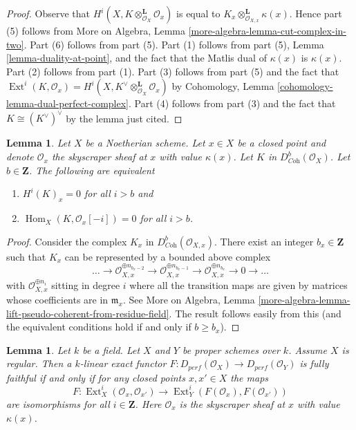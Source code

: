 \documentclass{stacks-project}
\theoremstyle{plain}
\newtheorem{lemma}[subsection]{Lemma}
\theoremstyle{definition}
\theoremstyle{remark}
\numberwithin{equation}{subsection}
\def\Hom{\mathop{\mathrm{Hom}}\nolimits}
\def\Ext{\mathop{\mathrm{Ext}}\nolimits}
\begin{document}
\begin{proof}
Observe that $H^i(X, K \otimes_{\mathcal{O}_X}^\mathbf{L} \mathcal{O}_x)$
is equal to $K_x  \otimes_{\mathcal{O}_{X, x}}^\mathbf{L} \kappa(x)$.
Hence part (5) follows from More on Algebra, Lemma
\ref{more-algebra-lemma-cut-complex-in-two}.
Part (6) follows from part (5).
Part (1) follows from part (5), Lemma \ref{lemma-duality-at-point}, and the
fact that the Matlis dual of $\kappa(x)$ is $\kappa(x)$.
Part (2) follows from part (1).
Part (3) follows from part (5) and the fact that
$\Ext^i(K, \mathcal{O}_x) =
H^i(X, K^\vee \otimes_{\mathcal{O}_X}^\mathbf{L} \mathcal{O}_x)$ by
Cohomology, Lemma \ref{cohomology-lemma-dual-perfect-complex}.
Part (4) follows from part (3) and the fact that $K \cong (K^\vee)^\vee$
by the lemma just cited.
\end{proof}

\begin{lemma}
\label{lemma-hom-into-point-sheaf}
Let $X$ be a Noetherian scheme. Let $x \in X$ be a closed point and
denote $\mathcal{O}_x$ the skyscraper sheaf at $x$ with value $\kappa(x)$.
Let $K$ in $D^b_{\textit{Coh}}(\mathcal{O}_X)$. Let $b \in \mathbf{Z}$.
The following are equivalent
\begin{enumerate}
\item $H^i(K)_x = 0$ for all $i > b$ and
\item $\Hom_X(K, \mathcal{O}_x[-i]) = 0$ for all $i > b$.
\end{enumerate}
\end{lemma}

\begin{proof}
Consider the complex $K_x$ in $D^b_{\textit{Coh}}(\mathcal{O}_{X, x})$.
There exist an integer $b_x \in \mathbf{Z}$ such that $K_x$
can be represented by a bounded above complex
$$
\ldots \to
\mathcal{O}_{X, x}^{\oplus n_{b_x - 2}} \to
\mathcal{O}_{X, x}^{\oplus n_{b_x - 1}} \to
\mathcal{O}_{X, x}^{\oplus n_{b_x}} \to 0 \to \ldots
$$
with $\mathcal{O}_{X, x}^{\oplus n_i}$ sitting in degree $i$
where all the transition maps are given by matrices whose
coefficients are in $\mathfrak m_x$. See
More on Algebra, Lemma
\ref{more-algebra-lemma-lift-pseudo-coherent-from-residue-field}.
The result follows easily from this (and the equivalent
conditions hold if and only if $b \geq b_x$).
\end{proof}

\begin{lemma}
\label{lemma-get-fully-faithful-geometric}
Let $k$ be a field. Let $X$ and $Y$ be proper schemes over $k$.
Assume $X$ is regular. Then a $k$-linear exact functor
$F : D_{perf}(\mathcal{O}_X) \to D_{perf}(\mathcal{O}_Y)$
is fully faithful if and only if
for any closed points $x, x' \in X$ the maps
$$
F : \Ext^i_X(\mathcal{O}_x, \mathcal{O}_{x'})
\longrightarrow
\Ext^i_Y(F(\mathcal{O}_x), F(\mathcal{O}_{x'}))
$$
are isomorphisms for all $i \in \mathbf{Z}$.
Here $\mathcal{O}_x$ is the skyscraper sheaf at $x$ with value $\kappa(x)$.
\end{lemma}
\end{document}
